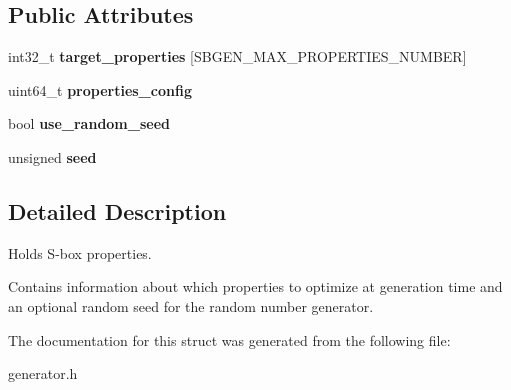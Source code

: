 \subsection*{Public Attributes}
\begin{DoxyCompactItemize}
\item 
\mbox{\label{structsbgen_1_1properties__info__t_aeb72c0ac26f770a2cec3455cf9eeef95}} 
int32\+\_\+t {\bfseries target\+\_\+properties} \mbox{[}S\+B\+G\+E\+N\+\_\+\+M\+A\+X\+\_\+\+P\+R\+O\+P\+E\+R\+T\+I\+E\+S\+\_\+\+N\+U\+M\+B\+ER\mbox{]}
\item 
\mbox{\label{structsbgen_1_1properties__info__t_acc9615eb2f63c1a206f99acf79c96bfa}} 
uint64\+\_\+t {\bfseries properties\+\_\+config}
\item 
\mbox{\label{structsbgen_1_1properties__info__t_ae22d660caeb940513b8612e0e2bd31ec}} 
bool {\bfseries use\+\_\+random\+\_\+seed}
\item 
\mbox{\label{structsbgen_1_1properties__info__t_afa6c0758b3bc2e12e424751a89639362}} 
unsigned {\bfseries seed}
\end{DoxyCompactItemize}


\subsection{Detailed Description}
Holds S-\/box properties. 

Contains information about which properties to optimize at generation time and an optional random seed for the random number generator. 

The documentation for this struct was generated from the following file\+:\begin{DoxyCompactItemize}
\item 
generator.\+h\end{DoxyCompactItemize}
